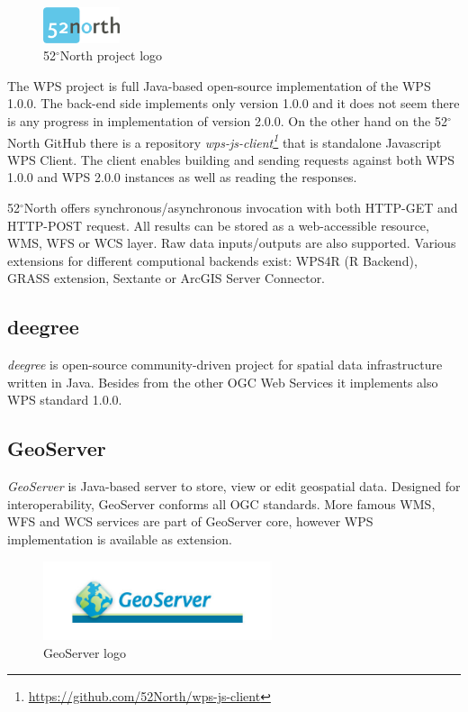 \documentclass[12pt,a4paper]{article}
\begin{document}
\begin{figure}[h!]
\centering
\includegraphics[width=0.2\textwidth]{img/Intro_52north.png}
\caption{52$^{\circ}$North project logo}
\label{fig:Intro_52north}
\end{figure}

The  WPS project is full Java-based open-source implementation of the WPS 1.0.0. The back-end side implements only version 1.0.0 and it
does not seem there is any progress in implementation of version 2.0.0. On the other hand on the 52$^{\circ}$North GitHub there is a
repository \textit{wps-js-client\footnote{\url{https://github.com/52North/wps-js-client}}} that is standalone Javascript WPS Client. 
The client enables building and sending requests against both WPS 1.0.0 and WPS 2.0.0 instances as well as reading the responses.

52$^{\circ}$North offers synchronous/asynchronous invocation with both HTTP-GET and HTTP-POST request. All results can be stored as
a web-accessible resource, WMS, WFS or WCS layer. Raw data inputs/outputs are also supported. Various extensions for different
computional backends exist: WPS4R (R Backend), GRASS extension, Sextante or ArcGIS Server Connector.

\subsection{deegree}
\textit{deegree} is open-source community-driven project for spatial data infrastructure written in Java. Besides from the other OGC Web Services it implements also WPS standard 1.0.0. 

\subsection{GeoServer}
\textit{GeoServer} is Java-based server to store, view or edit geospatial data. Designed for interoperability, GeoServer conforms
all OGC standards. More famous WMS, WFS and WCS services are part of GeoServer core, however WPS implementation is available as 
extension.

\begin{figure}[h!]
\centering
\includegraphics[width=0.6\textwidth]{img/geoserver.jpg}
\caption{GeoServer logo}
\label{fig:geoserver_logo}
\end{figure}
\end{document}

